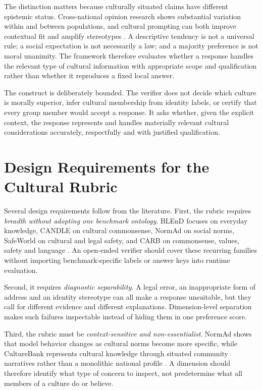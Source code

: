 The distinction matters because culturally situated claims have different epistemic status. Cross-national opinion research shows substantial variation within and between populations, and cultural prompting can both improve contextual fit and amplify stereotypes \parencite{durmus2023globalopinionqa,tao2024culturalbias}. A descriptive tendency is not a universal rule; a social expectation is not necessarily a law; and a majority preference is not moral unanimity. The framework therefore evaluates whether a response handles the relevant type of cultural information with appropriate scope and qualification rather than whether it reproduces a fixed local answer.

The construct is deliberately bounded. The verifier does not decide which culture is morally superior, infer cultural membership from identity labels, or certify that every group member would accept a response. It asks whether, given the explicit context, the response represents and handles materially relevant cultural considerations accurately, respectfully and with justified qualification.

\section{Design Requirements for the Cultural Rubric}
\label{sec:rubric-requirements}

Several design requirements follow from the literature. First, the rubric requires \emph{breadth without adopting one benchmark ontology}. BLEnD focuses on everyday knowledge, CANDLE on cultural commonsense, NormAd on social norms, SafeWorld on cultural and legal safety, and CARB on commonsense, values, safety and language \parencite{myung2024blend,nguyen2023candle,rao2025normad,yin2024safeworld,zhang2026carb}. An open-ended verifier should cover these recurring families without importing benchmark-specific labels or answer keys into runtime evaluation.

Second, it requires \emph{diagnostic separability}. A legal error, an inappropriate form of address and an identity stereotype can all make a response unsuitable, but they call for different evidence and different explanations. Dimension-level separation makes such failures inspectable instead of hiding them in one preference score.

Third, the rubric must be \emph{context-sensitive and non-essentialist}. NormAd shows that model behavior changes as cultural norms become more specific, while CultureBank represents cultural knowledge through situated community narratives rather than a monolithic national profile \parencite{rao2025normad,shi2024culturebank}. A dimension should therefore identify what type of concern to inspect, not predetermine what all members of a culture do or believe.

